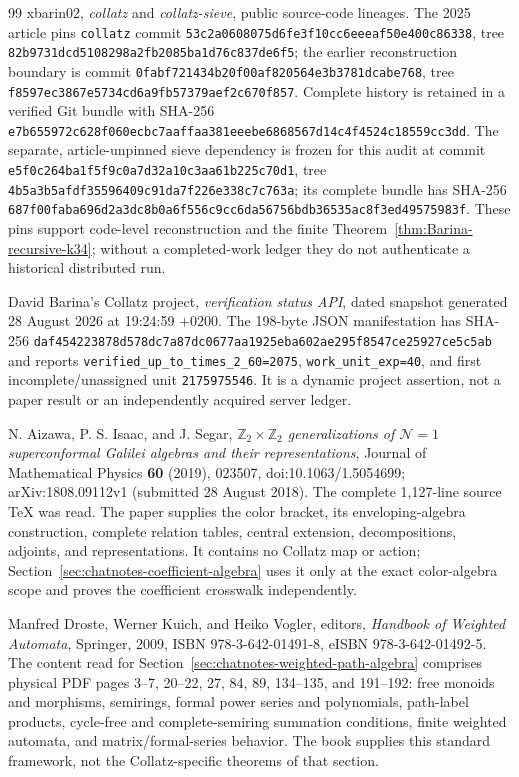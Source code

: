 \begin{thebibliography}{99}
xbarin02,
\emph{collatz} and \emph{collatz-sieve}, public source-code lineages.
The 2025 article pins \texttt{collatz} commit
\nolinkurl{53c2a0608075d6fe3f10cc6eeeaf50e400c86338}, tree
\nolinkurl{82b9731dcd5108298a2fb2085ba1d76c837de6f5}; the earlier reconstruction
boundary is commit
\nolinkurl{0fabf721434b20f00af820564e3b3781dcabe768}, tree
\nolinkurl{f8597ec3867e5734cd6a9fb57379aef2c670f857}.  Complete history is retained
in a verified Git bundle with SHA-256
\nolinkurl{e7b655972c628f060ecbc7aaffaa381eeebe6868567d14c4f4524c18559cc3dd}.
The separate, article-unpinned sieve dependency is frozen for this audit at
commit \nolinkurl{e5f0c264ba1f5f9c0a7d32a10c3aa61b225c70d1}, tree
\nolinkurl{4b5a3b5afdf35596409c91da7f226e338c7c763a}; its complete bundle has
SHA-256
\nolinkurl{687f00faba696d2a3dc8b0a6f556c9cc6da56756bdb36535ac8f3ed49575983f}.
These pins support code-level reconstruction and the finite
Theorem~\ref{thm:Barina-recursive-k34}; without a completed-work ledger they
do not authenticate a historical distributed run.

David Barina's Collatz project,
\emph{verification status API}, dated snapshot generated 28 August 2026 at
19:24:59 $+0200$.  The 198-byte JSON manifestation has SHA-256
\nolinkurl{daf454223878d578dc7a87dc0677aa1925eba602ae295f8547ce25927ce5c5ab}
and reports \texttt{verified\_up\_to\_times\_2\_60=2075},
\texttt{work\_unit\_exp=40}, and first incomplete/unassigned unit
\texttt{2175975546}.  It is a dynamic project assertion, not a paper result
or an independently acquired server ledger.

N. Aizawa, P. S. Isaac, and J. Segar,
\emph{$\mathbb Z_2\times\mathbb Z_2$ generalizations of
$\mathcal N=1$ superconformal Galilei algebras and their representations},
Journal of Mathematical Physics \textbf{60} (2019), 023507,
doi:10.1063/1.5054699; arXiv:1808.09112v1 (submitted 28 August 2018).
The complete 1,127-line source \TeX{} was read.  The paper supplies the color
bracket, its enveloping-algebra construction, complete relation tables,
central extension, decompositions, adjoints, and representations.  It contains
no Collatz map or action; Section~\ref{sec:chatnotes-coefficient-algebra}
uses it only at the exact color-algebra scope and proves the coefficient
crosswalk independently.

Manfred Droste, Werner Kuich, and Heiko Vogler, editors,
\emph{Handbook of Weighted Automata},
Springer, 2009, ISBN 978-3-642-01491-8,
eISBN 978-3-642-01492-5.
The content read for Section~\ref{sec:chatnotes-weighted-path-algebra}
comprises physical PDF pages 3--7, 20--22, 27, 84, 89, 134--135, and
191--192: free monoids and morphisms, semirings, formal power series and
polynomials, path-label products, cycle-free and complete-semiring summation
conditions, finite weighted automata, and matrix/formal-series behavior.  The
book supplies this standard framework, not the Collatz-specific theorems of
that section.


\end{thebibliography}
